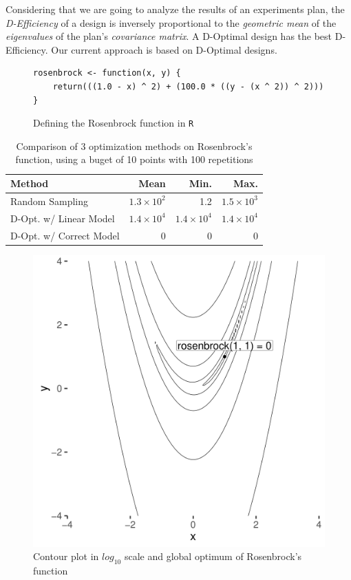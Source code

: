 \documentclass[conference]{IEEEtran}
\begin{document}
Considering that we are going to analyze the results of an experiments plan, the
\emph{D-Efficiency} of a design is inversely proportional to the \emph{geometric mean} of
the \emph{eigenvalues} of the plan's \emph{covariance matrix}. A D-Optimal design has the
best D-Efficiency. Our current approach is based on D-Optimal designs.

\begin{figure}
\lstset{language=r,label= ,caption= ,captionpos=b,numbers=none}
\begin{lstlisting}
rosenbrock <- function(x, y) {
    return(((1.0 - x) ^ 2) + (100.0 * ((y - (x ^ 2)) ^ 2)))
}
\end{lstlisting}
\caption{Defining the Rosenbrock function in \texttt{R}}
\end{figure}

\begin{table}[ht]
\centering
\caption{Comparison of 3 optimization methods on Rosenbrock's function, using a buget of 10 points with 100 repetitions}
\begingroup\small
\begin{tabular}{lrrr}
  \toprule
Method & Mean & Min. & Max. \\
  \midrule
Random Sampling & $1.3 \times 10^{2}$ & 1.2 & $1.5 \times 10^{3}$ \\
  D-Opt. w/ Linear Model & $1.4 \times 10^{4}$ & $1.4 \times 10^{4}$ & $1.4 \times 10^{4}$ \\
  D-Opt. w/ Correct Model &   0 &   0 &   0 \\
   \bottomrule
\end{tabular}
\endgroup
\end{table}

\begin{center}
\begin{figure}
\begin{center}
\includegraphics[width=.8\columnwidth]{./img/rosenbrock.pdf}
\end{center}
\caption{Contour plot in \(log_{10}\) scale and global optimum of Rosenbrock's function}
\end{figure}
\end{center}
\end{document}
